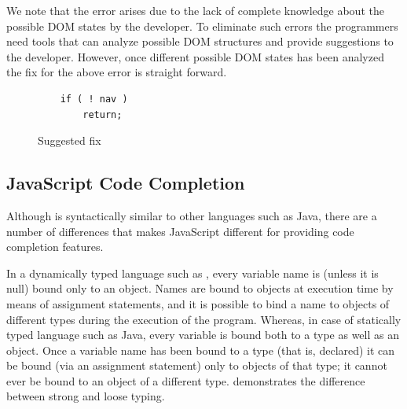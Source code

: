	We note that the error arises due to the lack of complete knowledge about the possible DOM states by the developer. To eliminate such errors the programmers need tools that can analyze possible DOM structures and provide suggestions to the developer. However, once different possible DOM states has been analyzed the fix for the above error is straight forward.
	
	
	\begin{figure}
	\medskip
	\begin{lstlisting}
	if ( ! nav )
		return;
	\end{lstlisting}
	\caption{Suggested fix}
	\label{Fig:Fix}
	\end{figure}
	
	
	
	\subsection{JavaScript Code Completion}
	\label{Sec:Code-completion}
	
	Although \javascript is syntactically similar to other languages such as Java, there are a number of differences that makes JavaScript different for providing code completion features.
	
	
		In a dynamically typed language such as \javascript, every variable name is (unless it is null) bound only to an object. Names are bound to objects at execution time by means of assignment statements, and it is possible to bind a name to objects of different types during the execution of the program. Whereas, in case of statically typed language such as Java, every variable is bound both to a type as well as an object. Once a variable name has been bound to a type (that is, declared) it can be bound (via an assignment statement) only to objects of that type; it cannot ever be bound to an object of a different type.  demonstrates the difference between strong and loose typing.

